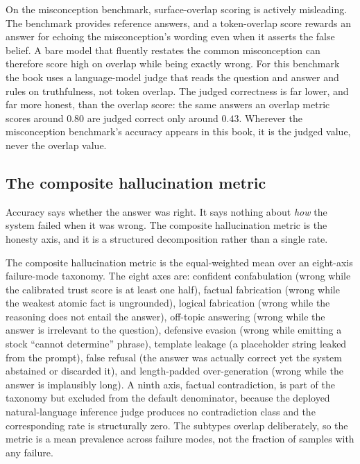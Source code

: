 \begin{pitfall}
On the misconception benchmark, surface-overlap scoring is actively misleading. The
benchmark provides reference answers, and a token-overlap score rewards an answer for
echoing the misconception's wording even when it asserts the false belief. A bare
model that fluently restates the common misconception can therefore score high on
overlap while being exactly wrong. For this benchmark the book uses a language-model
judge that reads the question and answer and rules on truthfulness, not token
overlap. The judged correctness is far lower, and far more honest, than the overlap
score: the same answers an overlap metric scores around $0.80$ are judged correct
only around $0.43$. Wherever the misconception benchmark's accuracy appears in this
book, it is the judged value, never the overlap value.
\end{pitfall}

\subsection*{The composite hallucination metric}

Accuracy says whether the answer was right. It says nothing about \emph{how} the
system failed when it was wrong. The composite hallucination metric is the honesty
axis, and it is a structured decomposition rather than a single rate.

\begin{precise}
The composite hallucination metric is the equal-weighted mean over an eight-axis
failure-mode taxonomy. The eight axes are: confident confabulation (wrong while the
calibrated trust score is at least one half), factual fabrication (wrong while the
weakest atomic fact is ungrounded), logical fabrication (wrong while the reasoning
does not entail the answer), off-topic answering (wrong while the answer is
irrelevant to the question), defensive evasion (wrong while emitting a stock
``cannot determine'' phrase), template leakage (a placeholder string leaked from the
prompt), false refusal (the answer was actually correct yet the system abstained or
discarded it), and length-padded over-generation (wrong while the answer is
implausibly long). A ninth axis, factual contradiction, is part of the taxonomy but
excluded from the default denominator, because the deployed natural-language
inference judge produces no contradiction class and the corresponding rate is
structurally zero. The subtypes overlap deliberately, so the metric is a mean
prevalence across failure modes, not the fraction of samples with any failure.
\end{precise}

